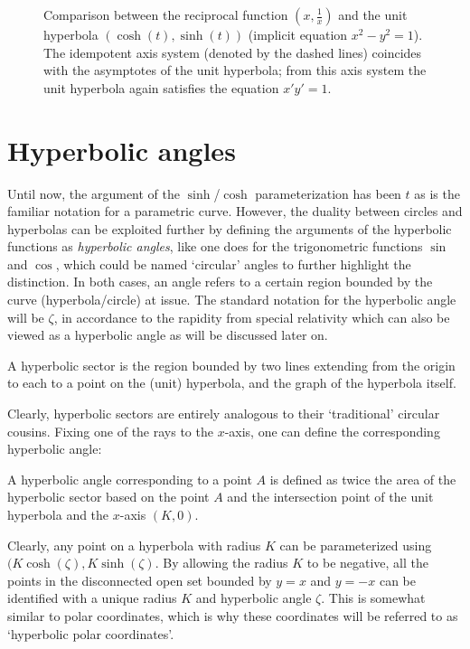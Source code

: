\begin{figure}[ht!]
    \centering
    
    \caption{Comparison between the reciprocal function $(x, \tfrac{1}{x})$ and the unit hyperbola $(\cosh(t), \sinh(t))$ (implicit equation $x^2 - y^2 = 1$). The idempotent axis system (denoted by the dashed lines) coincides with the asymptotes of the unit hyperbola; from this axis system the unit hyperbola again satisfies the equation $x' y' = 1$.}
    \label{fig:hyperbola_comparison}
\end{figure}

\section{Hyperbolic angles}
Until now, the argument of the $\sinh$/$\cosh$ parameterization has been $t$ as is the familiar notation for a parametric curve. However, the duality between circles and hyperbolas can be exploited further by defining the arguments of the hyperbolic functions as \emph{hyperbolic angles}, like one does for the trigonometric functions $\sin$ and $\cos$, which could be named `circular' angles to further highlight the distinction. In both cases, an angle refers to a certain region bounded by the curve (hyperbola/circle) at issue. The standard notation for the hyperbolic angle will be $\zeta$, in accordance to the rapidity from special relativity which can also be viewed as a hyperbolic angle as will be discussed later on. 
\begin{definition}
A hyperbolic sector is the region bounded by two lines extending from the origin to each to a point on the (unit) hyperbola, and the graph of the hyperbola itself. 
\end{definition}
Clearly, hyperbolic sectors are entirely analogous to their `traditional' circular cousins. Fixing one of the rays to the $x$-axis, one can define the corresponding hyperbolic angle:
\begin{definition}
A hyperbolic angle corresponding to a point $A$ is defined as twice the area of the hyperbolic sector based on the point $A$ and the intersection point of the unit hyperbola and the $x$-axis $(K, 0)$.
\end{definition}
Clearly, any point on a hyperbola with radius $K$ can be parameterized using $(K\cosh(\zeta), K\sinh(\zeta)$. By allowing the radius $K$ to be negative, all the points in the disconnected open set bounded by $y = x$ and $y = -x$ can be identified with a unique radius $K$ and hyperbolic angle $\zeta$. This is somewhat similar to polar coordinates, which is why these coordinates will be referred to as `hyperbolic polar coordinates'.

